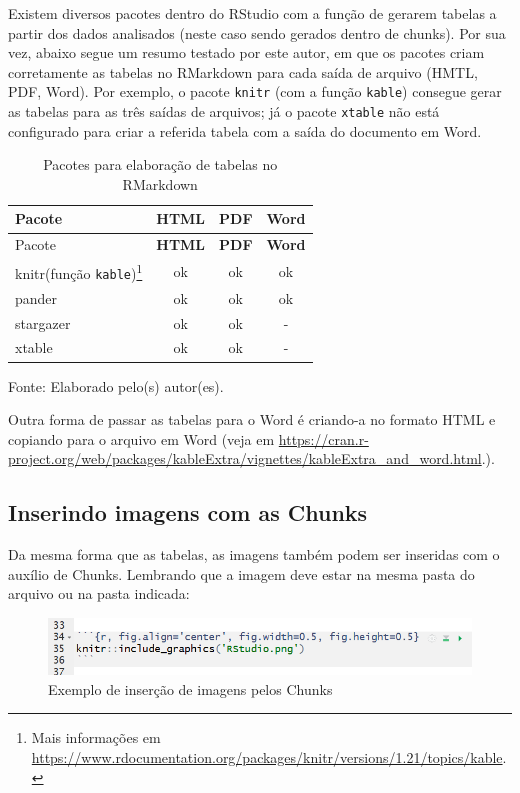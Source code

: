 \documentclass[12pt,brazil,oneside]{book}
\let\rmarkdownfootnote\footnote%
\def\footnote{\protect\rmarkdownfootnote}
\begin{document}
Existem diversos pacotes dentro do RStudio com a função de gerarem tabelas a partir dos dados analisados (neste caso sendo gerados dentro de chunks). Por sua vez, abaixo segue um resumo testado por este autor, em que os pacotes criam corretamente as tabelas no RMarkdown para cada saída de arquivo (HMTL, PDF, Word). Por exemplo, o pacote \texttt{knitr} (com a função \texttt{kable}) consegue gerar as tabelas para as três saídas de arquivos; já o pacote \texttt{xtable} não está configurado para criar a referida tabela com a saída do documento em Word.

\begin{longtable}[]{@{}lccc@{}}
\caption{\label{tab:tabelasrmk}Pacotes para elaboração de tabelas no RMarkdown}\tabularnewline
\toprule
Pacote & \textbf{HTML} & \textbf{PDF} & \textbf{Word}\tabularnewline
\midrule
\endfirsthead
\toprule
Pacote & \textbf{HTML} & \textbf{PDF} & \textbf{Word}\tabularnewline
\midrule
\endhead
knitr(função \texttt{kable})\footnote{Mais informações em \url{https://www.rdocumentation.org/packages/knitr/versions/1.21/topics/kable}. } & ok & ok & ok\tabularnewline
pander & ok & ok & ok\tabularnewline
stargazer & ok & ok & -\tabularnewline
xtable & ok & ok & -\tabularnewline
\bottomrule
\end{longtable}

Fonte: Elaborado pelo(s) autor(es).

Outra forma de passar as tabelas para o Word é criando-a no formato HTML e copiando para o arquivo em Word (veja em \url{https://cran.r-project.org/web/packages/kableExtra/vignettes/kableExtra_and_word.html}.).

\hypertarget{inserindo-imagens-com-as-chunks}{%
\subsection{Inserindo imagens com as Chunks}\label{inserindo-imagens-com-as-chunks}}

Da mesma forma que as tabelas, as imagens também podem ser inseridas com o auxílio de Chunks. Lembrando que a imagem deve estar na mesma pasta do arquivo ou na pasta indicada:

\begin{figure}[H]

{\centering \includegraphics[width=0.7\linewidth]{rmarkchunkimg} 

}

\caption{Exemplo de inserção de imagens pelos Chunks}\label{fig:rmarkchunk333}
\end{figure}
\end{document}
